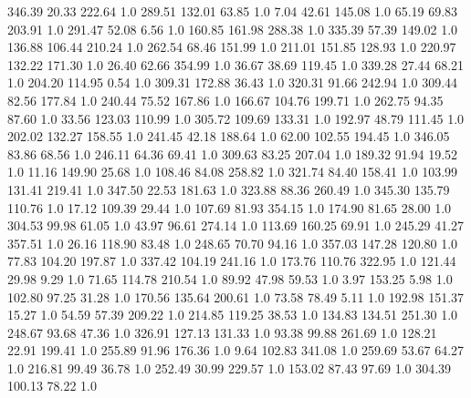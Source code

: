     346.39     20.33    222.64  1.0
    289.51    132.01     63.85  1.0
      7.04     42.61    145.08  1.0
     65.19     69.83    203.91  1.0
    291.47     52.08      6.56  1.0
    160.85    161.98    288.38  1.0
    335.39     57.39    149.02  1.0
    136.88    106.44    210.24  1.0
    262.54     68.46    151.99  1.0
    211.01    151.85    128.93  1.0
    220.97    132.22    171.30  1.0
     26.40     62.66    354.99  1.0
     36.67     38.69    119.45  1.0
    339.28     27.44     68.21  1.0
    204.20    114.95      0.54  1.0
    309.31    172.88     36.43  1.0
    320.31     91.66    242.94  1.0
    309.44     82.56    177.84  1.0
    240.44     75.52    167.86  1.0
    166.67    104.76    199.71  1.0
    262.75     94.35     87.60  1.0
     33.56    123.03    110.99  1.0
    305.72    109.69    133.31  1.0
    192.97     48.79    111.45  1.0
    202.02    132.27    158.55  1.0
    241.45     42.18    188.64  1.0
     62.00    102.55    194.45  1.0
    346.05     83.86     68.56  1.0
    246.11     64.36     69.41  1.0
    309.63     83.25    207.04  1.0
    189.32     91.94     19.52  1.0
     11.16    149.90     25.68  1.0
    108.46     84.08    258.82  1.0
    321.74     84.40    158.41  1.0
    103.99    131.41    219.41  1.0
    347.50     22.53    181.63  1.0
    323.88     88.36    260.49  1.0
    345.30    135.79    110.76  1.0
     17.12    109.39     29.44  1.0
    107.69     81.93    354.15  1.0
    174.90     81.65     28.00  1.0
    304.53     99.98     61.05  1.0
     43.97     96.61    274.14  1.0
    113.69    160.25     69.91  1.0
    245.29     41.27    357.51  1.0
     26.16    118.90     83.48  1.0
    248.65     70.70     94.16  1.0
    357.03    147.28    120.80  1.0
     77.83    104.20    197.87  1.0
    337.42    104.19    241.16  1.0
    173.76    110.76    322.95  1.0
    121.44     29.98      9.29  1.0
     71.65    114.78    210.54  1.0
     89.92     47.98     59.53  1.0
      3.97    153.25      5.98  1.0
    102.80     97.25     31.28  1.0
    170.56    135.64    200.61  1.0
     73.58     78.49      5.11  1.0
    192.98    151.37     15.27  1.0
     54.59     57.39    209.22  1.0
    214.85    119.25     38.53  1.0
    134.83    134.51    251.30  1.0
    248.67     93.68     47.36  1.0
    326.91    127.13    131.33  1.0
     93.38     99.88    261.69  1.0
    128.21     22.91    199.41  1.0
    255.89     91.96    176.36  1.0
      9.64    102.83    341.08  1.0
    259.69     53.67     64.27  1.0
    216.81     99.49     36.78  1.0
    252.49     30.99    229.57  1.0
    153.02     87.43     97.69  1.0
    304.39    100.13     78.22  1.0
